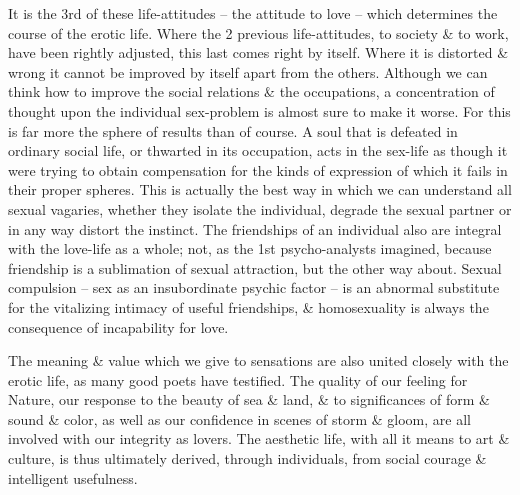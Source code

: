 \documentclass{article}
\begin{document}
It is the 3rd of these life-attitudes -- the attitude to love -- which determines the course of the erotic life. Where the 2 previous life-attitudes, to society \& to work, have been rightly adjusted, this last comes right by itself. Where it is distorted \& wrong it cannot be improved by itself apart from the others. Although we can think how to improve the social relations \& the occupations, a concentration of thought upon the individual sex-problem is almost sure to make it worse. For this is far more the sphere of results than of course. A soul that is defeated in ordinary social life, or thwarted in its occupation, acts in the sex-life as though it were trying to obtain compensation for the kinds of expression of which it fails in their proper spheres. This is actually the best way in which we can understand all sexual vagaries, whether they isolate the individual, degrade the sexual partner or in any way distort the instinct. The friendships of an individual also are integral with the love-life as a whole; not, as the 1st psycho-analysts imagined, because friendship is a sublimation of sexual attraction, but the other way about. Sexual compulsion -- sex as an insubordinate psychic factor -- is an abnormal substitute for the vitalizing intimacy of useful friendships, \& homosexuality is always the consequence of incapability for love.

The meaning \& value which we give to sensations are also united closely with the erotic life, as many good poets have testified. The quality of our feeling for Nature, our response to the beauty of sea \& land, \& to significances of form \& sound \& color, as well as our confidence in scenes of storm \& gloom, are all involved with our integrity as lovers. The aesthetic life, with all it means to art \& culture, is thus ultimately derived, through individuals, from social courage \& intelligent usefulness.
\end{document}
